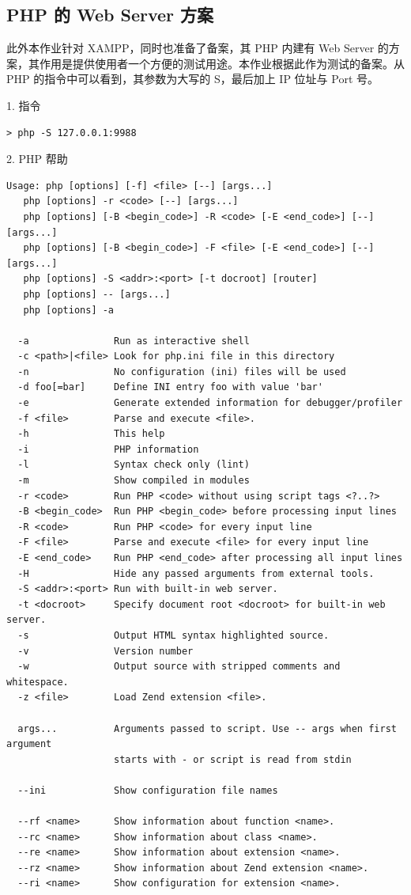 \subsection{PHP 的 Web Server 方案}

此外本作业针对 XAMPP，同时也准备了备案，其 PHP 内建有 Web Server 的方案，其作用是提供使用者一个方便的测试用途。本作业根据此作为测试的备案。从 PHP 的指令中可以看到，其参数为大写的 S，最后加上 IP 位址与 Port 号。

1. 指令

\begin{Verbatim}
> php -S 127.0.0.1:9988
\end{Verbatim}

2. PHP 帮助

\begin{Verbatim}
Usage: php [options] [-f] <file> [--] [args...]
   php [options] -r <code> [--] [args...]
   php [options] [-B <begin_code>] -R <code> [-E <end_code>] [--] [args...]
   php [options] [-B <begin_code>] -F <file> [-E <end_code>] [--] [args...]
   php [options] -S <addr>:<port> [-t docroot] [router]
   php [options] -- [args...]
   php [options] -a

  -a               Run as interactive shell
  -c <path>|<file> Look for php.ini file in this directory
  -n               No configuration (ini) files will be used
  -d foo[=bar]     Define INI entry foo with value 'bar'
  -e               Generate extended information for debugger/profiler
  -f <file>        Parse and execute <file>.
  -h               This help
  -i               PHP information
  -l               Syntax check only (lint)
  -m               Show compiled in modules
  -r <code>        Run PHP <code> without using script tags <?..?>
  -B <begin_code>  Run PHP <begin_code> before processing input lines
  -R <code>        Run PHP <code> for every input line
  -F <file>        Parse and execute <file> for every input line
  -E <end_code>    Run PHP <end_code> after processing all input lines
  -H               Hide any passed arguments from external tools.
  -S <addr>:<port> Run with built-in web server.
  -t <docroot>     Specify document root <docroot> for built-in web server.
  -s               Output HTML syntax highlighted source.
  -v               Version number
  -w               Output source with stripped comments and whitespace.
  -z <file>        Load Zend extension <file>.

  args...          Arguments passed to script. Use -- args when first argument
                   starts with - or script is read from stdin

  --ini            Show configuration file names

  --rf <name>      Show information about function <name>.
  --rc <name>      Show information about class <name>.
  --re <name>      Show information about extension <name>.
  --rz <name>      Show information about Zend extension <name>.
  --ri <name>      Show configuration for extension <name>.
\end{Verbatim}

